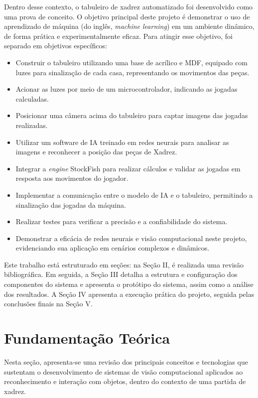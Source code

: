 \documentclass[journal]{IEEEtran} %
\begin{document}
Dentro desse contexto, o tabuleiro de xadrez automatizado foi desenvolvido como uma prova de conceito. O objetivo principal deste projeto é demonstrar o uso de aprendizado de máquina (do inglês, \textit{machine learning}) em um ambiente dinâmico, de forma prática e experimentalmente eficaz. Para atingir esse objetivo, foi separado em objetivos específicos:

\begin{itemize}
    \item Construir o tabuleiro utilizando uma base de acrílico e MDF, equipado com luzes para sinalização de cada casa, representando os movimentos das peças.
    \item Acionar as luzes por meio de um microcontrolador, indicando as jogadas calculadas.
    \item Posicionar uma câmera acima do tabuleiro para captar imagens das jogadas realizadas.
    \item Utilizar um software de IA treinado em redes neurais para analisar as imagens e reconhecer a posição das peças de Xadrez.
    \item Integrar a \textit{engine} StockFish para realizar cálculos e validar as jogadas em resposta aos movimentos do jogador.
    \item Implementar a comunicação entre o modelo de IA e o tabuleiro, permitindo a sinalização das jogadas da máquina.
    \item Realizar testes para verificar a precisão e a confiabilidade do sistema.
    \item Demonstrar a eficácia de redes neurais e visão computacional neste projeto, evidenciando sua aplicação em cenários complexos e dinâmicos.
\end{itemize}

Este trabalho está estruturado em seções: na Seção II, é realizada uma revisão bibliográfica. Em seguida, a Seção III detalha a estrutura e configuração dos componentes do sistema e apresenta o protótipo do sistema, assim como a análise dos resultados. A Seção IV apresenta a execução prática do projeto, seguida pelas conclusões finais na Seção V.

\section{Fundamentação Teórica}

Nesta seção, apresenta-se uma revisão dos principais conceitos e tecnologias que sustentam o desenvolvimento de sistemas de visão computacional aplicados ao reconhecimento e interação com objetos, dentro do contexto de uma partida de xadrez.
\end{document}
